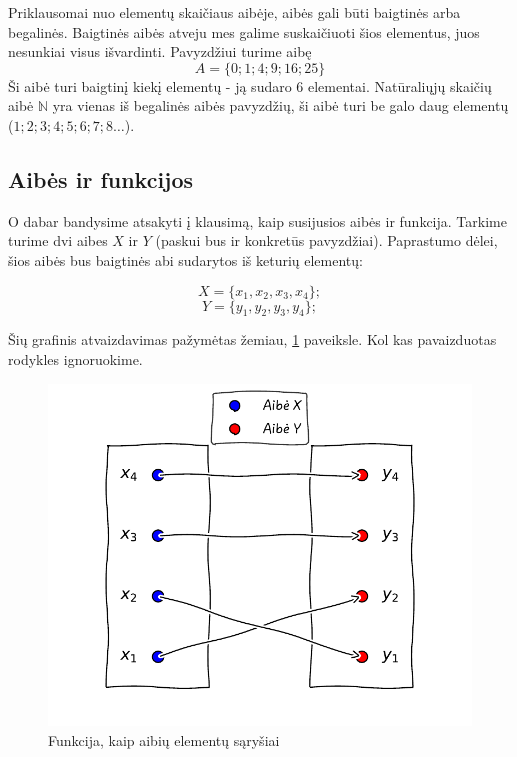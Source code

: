 \documentclass{tufte-handout}
\begin{document}
Priklausomai nuo elementų skaičiaus aibėje, aibės gali būti baigtinės arba
begalinės. Baigtinės aibės atveju mes galime suskaičiuoti šios elementus, juos
nesunkiai visus išvardinti. Pavyzdžiui turime aibę
$$A=\{0; 1; 4; 9; 16; 25\} $$
Ši aibė turi baigtinį kiekį elementų - ją sudaro 6 elementai. Natūraliųjų
skaičių aibė $\mathbb{N}$ yra vienas iš begalinės aibės pavyzdžių, ši aibė turi
be galo daug
elementų ($1;2;3;4;5;6;7;8\ldots$).

\subsection{Aibės ir funkcijos}\label{sec:about_sets_and_functions}

O dabar bandysime atsakyti į klausimą, kaip susijusios aibės ir funkcija.
Tarkime turime dvi aibes $X$ ir $Y$ (paskui bus ir konkretūs pavyzdžiai).
Paprastumo dėlei, šios aibės bus baigtinės abi sudarytos iš keturių elementų:

$$X = \{x_{1},x_{2},x_{3},x_{4}\};$$
$$Y = \{y_{1},y_{2},y_{3},y_{4}\};$$

Šių grafinis atvaizdavimas pažymėtas žemiau,
\ref{fig:function_as_sets_elements_relation} paveiksle. Kol kas pavaizduotas
rodykles ignoruokime.

\begin{figure}[!htpb]
  \includegraphics{./graphs/functions_as_graphs.pdf}
  \caption{Funkcija, kaip aibių elementų sąryšiai}
  \label{fig:function_as_sets_elements_relation}
\end{figure}
\end{document}
